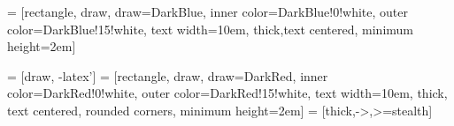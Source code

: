 \documentclass{article}
\begin{document}
 = [rectangle, draw, draw=DarkBlue, inner
color=DarkBlue!0!white, outer color=DarkBlue!15!white,
text width=10em, thick,text centered, minimum height=2em] %

 = [draw, -latex']%
 = [rectangle, draw, draw=DarkRed, inner
color=DarkRed!0!white, outer color=DarkRed!15!white, text width=10em,
thick, text centered, rounded corners, minimum height=2em] %
 = [thick,->,>=stealth]

\end{document}
